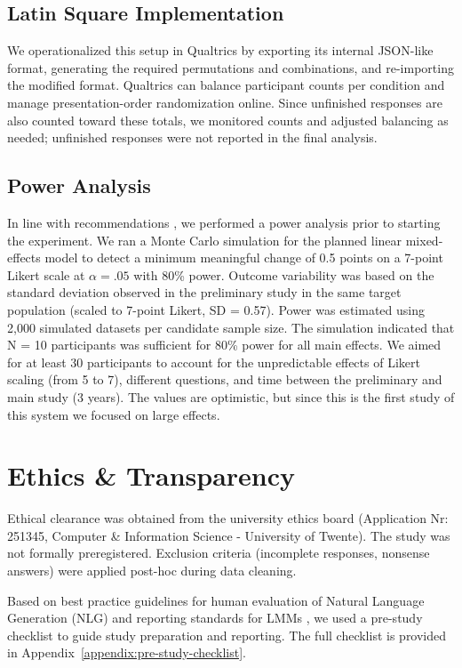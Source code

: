 \subsection{Latin Square Implementation}
We operationalized this setup in Qualtrics by exporting its internal JSON-like format, generating the required permutations and combinations, and re-importing the modified format. Qualtrics can balance participant counts per condition and manage presentation-order randomization online. Since unfinished responses are also counted toward these totals, we monitored counts and adjusted balancing as needed; unfinished responses were not reported in the final analysis.
\subsection{Power Analysis}
In line with recommendations \cite{meteyard2020}, we performed a power analysis prior to starting the experiment.
We ran a Monte Carlo simulation for the planned linear mixed-effects model to detect a minimum meaningful change of 0.5 points on a 7-point Likert scale at $\alpha = .05$ with 80\% power. Outcome variability was based on the standard deviation observed in the preliminary study in the same target population (scaled to 7-point Likert, SD = 0.57). Power was estimated using 2,000 simulated datasets per candidate sample size. The simulation indicated that N = 10 participants was sufficient for 80\% power for all main effects. We aimed for at least 30 participants to account for the unpredictable effects of Likert scaling (from 5 to 7), different questions, and time between the preliminary and main study (3 years). The values are optimistic, but since this is the first study of this system we focused on large effects.

\section{Ethics \& Transparency}
Ethical clearance was obtained from the university ethics board (Application Nr: 251345, Computer \& Information Science - University of Twente). The study was not formally preregistered. Exclusion criteria (incomplete responses, nonsense answers) were applied post-hoc during data cleaning.

Based on best practice guidelines for human evaluation of Natural Language Generation (NLG) \cite{vanderlee2021} and reporting standards for LMMs \cite{meteyard2020}, we used a pre-study checklist to guide study preparation and reporting. The full checklist is provided in Appendix~\ref{appendix:pre-study-checklist}.

